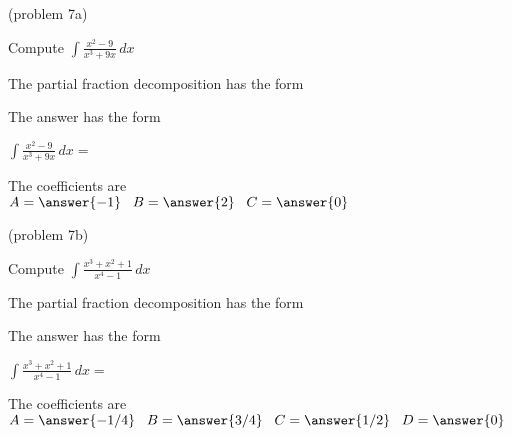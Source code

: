 \documentclass[handout]{ximera}
\begin{document}
\begin{problem}(problem 7a)

Compute $\displaystyle{\int \frac{x^2 - 9}{x^3 + 9x} \, dx}$

The partial fraction decomposition has the form

\begin{multipleChoice}
\end{multipleChoice}

The answer has the form

$\displaystyle{\int \frac{x^2 - 9}{x^3 + 9x} \, dx=}$

\begin{multipleChoice}
\end{multipleChoice}

The coefficients are\\
$A = \answer{-1} \;\;\; B = \answer{2} \;\;\; C = \answer{0}$

\end{problem}




\begin{problem}(problem 7b)

Compute $\displaystyle{\int \frac{x^3 + x^2 + 1}{x^4 - 1} \, dx}$

The partial fraction decomposition has the form

\begin{multipleChoice}
\end{multipleChoice}

The answer has the form

$\displaystyle{\int \frac{x^3 + x^2 + 1}{x^4 - 1} \, dx =}$

\begin{multipleChoice}
\end{multipleChoice}

The coefficients are\\
$A = \answer{-1/4} \;\;\; B = \answer{3/4} \;\;\; C = \answer{1/2} \;\;\; D = \answer{0}$

\end{problem}
\end{document}

